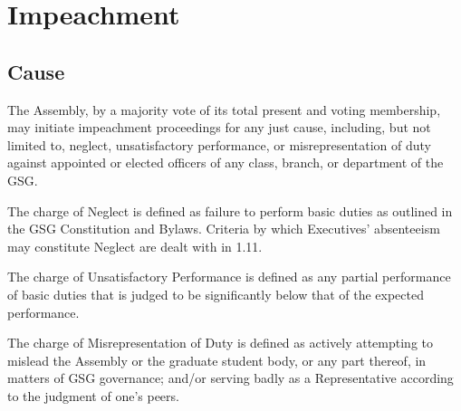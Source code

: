 \chapter{Impeachment}
\section{Cause}
The Assembly, by a majority vote of its total present and voting membership, may initiate impeachment proceedings for any just cause, including, but not limited to, neglect, unsatisfactory performance, or misrepresentation of duty against appointed or elected officers of any class, branch, or department of the GSG.
\begin{bylaws-number}
  \item The charge of Neglect is defined as failure to perform basic duties as outlined in the GSG Constitution and Bylaws. Criteria by which Executives’ absenteeism may constitute Neglect are dealt with in 1.11.
  \item The charge of Unsatisfactory Performance is defined as any partial performance of basic duties that is judged to be significantly below that of the expected performance.
  \item The charge of Misrepresentation of Duty is defined as actively attempting to mislead the Assembly or the graduate student body, or any part thereof, in matters of GSG governance; and/or serving badly as a Representative according to the judgment of one’s peers.
\end{bylaws-number}

